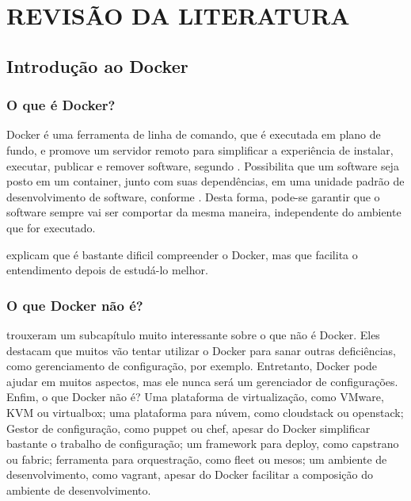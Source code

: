 \documentclass[
	12pt,				%
	openright,			%
	oneside,			%
	a4paper,			%
	chapter=TITLE,		%
	section=TITLE,		%
	english,			%
	french,				%
	spanish,			%
	brazil				%
	]{abntex2}
\begin{document}
\chapter{REVISÃO DA LITERATURA}\label{cap-revisao}

\section{Introdução ao Docker}

\subsection{O que é Docker?}

Docker é uma ferramenta de linha de comando, que é executada em plano de fundo, e promove um servidor remoto para simplificar a experiência de instalar, executar, publicar e remover software, segundo . Possibilita que um software seja posto em um container, junto com suas dependências, em uma unidade padrão de desenvolvimento de software, conforme . Desta forma, pode-se garantir que o software sempre vai ser comportar da mesma maneira, independente do ambiente que for executado.

 explicam que é bastante dificil compreender o Docker, mas que facilita o entendimento depois de estudá-lo melhor.


\subsection{O que Docker não é?}

 trouxeram um subcapítulo muito interessante sobre o que não é Docker. Eles destacam que muitos vão tentar utilizar o Docker para sanar outras deficiências, como gerenciamento de configuração, por exemplo. Entretanto, Docker pode ajudar em muitos aspectos, mas ele nunca será um gerenciador de configurações. Enfim, o que Docker não é? Uma plataforma de virtualização, como VMware, KVM ou virtualbox; uma plataforma para núvem, como cloudstack ou openstack; Gestor de configuração, como puppet ou chef, apesar do Docker simplificar bastante o trabalho de configuração; um framework para deploy, como capstrano ou fabric; ferramenta para orquestração, como fleet ou mesos; um ambiente de desenvolvimento, como vagrant, apesar do Docker facilitar a composição do ambiente de desenvolvimento.
\end{document}
